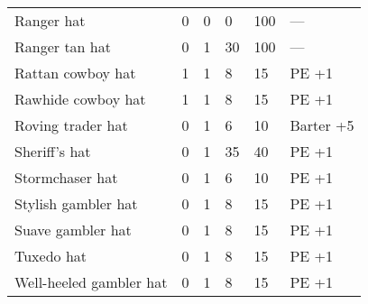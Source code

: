 \begin{longtable}{|p{4cm}|p{1.2cm}|p{1.2cm}|p{1.2cm}|p{1.2cm}|p{6cm}|}
Ranger hat & 0 & 0 & 0 & 100 & — \\
Ranger tan hat & 0 & 1 & 30 & 100 & — \\
Rattan cowboy hat & 1 & 1 & 8 & 15 & PE +1 \\
Rawhide cowboy hat & 1 & 1 & 8 & 15 & PE +1 \\
Roving trader hat & 0 & 1 & 6 & 10 & Barter +5 \\
Sheriff's hat & 0 & 1 & 35 & 40 & PE +1 \\
Stormchaser hat & 0 & 1 & 6 & 10 & PE +1 \\
Stylish gambler hat & 0 & 1 & 8 & 15 & PE +1 \\
Suave gambler hat & 0 & 1 & 8 & 15 & PE +1 \\
Tuxedo hat & 0 & 1 & 8 & 15 & PE +1 \\
Well-heeled gambler hat & 0 & 1 & 8 & 15 & PE +1 \\
\hline
\end{longtable}

